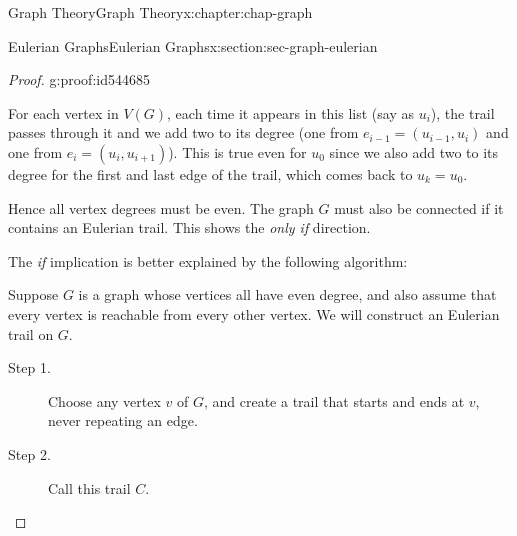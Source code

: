 \documentclass[oneside,10pt,]{book}
\numberwithin{equation}{section}
\begin{document}
\begin{chapterptx}{Graph Theory}{}{Graph Theory}{}{}{x:chapter:chap-graph}
\begin{sectionptx}{Eulerian Graphs}{}{Eulerian Graphs}{}{}{x:section:sec-graph-eulerian}
\begin{proof}{}{g:proof:id544685}
\begin{sidebyside}{1}{0.275}{0.275}{0}
\begin{sbspanel}{0.45}
{
}%
\end{sbspanel}%
\end{sidebyside}%
\par
For each vertex in \(V(G)\), each time it appears in this list (say as \(u_i\)), the trail passes through it and we add two to its degree (one from \(e_{i-1} = (u_{i-1},u_i)\) and one from \(e_i = (u_i,u_{i+1})\)). This is true even for \(u_0\) since we also add two to its degree for the first and last edge of the trail, which comes back to \(u_k = u_0\).%
\par
Hence all vertex degrees must be even. The graph \(G\) must also be connected if it contains an Eulerian trail. This shows the \emph{only if} direction.%
\par
The \emph{if} implication is better explained by the following algorithm:%
\par
Suppose \(G\) is a graph whose vertices all have even degree, and also assume that every vertex is reachable from every other vertex. We will construct an Eulerian trail on \(G\).%
\par
%
\begin{description}
\item[{Step 1.}]Choose any vertex \(v\) of \(G\), and create a trail that starts and ends at \(v\), never repeating an edge.%
\item[{Step 2.}]Call this trail \(C\).%

\end{description}
\end{proof}
\end{sectionptx}
\end{chapterptx}
\end{document}
